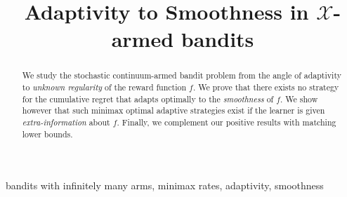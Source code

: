 \documentclass[final,12pt]{colt2018}
\title[Adaptivity in $\mathcal X$-armed bandits]{Adaptivity to Smoothness in $\mathcal X$-armed bandits}
\begin{document}
\maketitle

\begin{abstract}
We study the stochastic continuum-armed bandit problem from the angle of adaptivity to \emph{unknown regularity} of the reward function $f$. We prove that there exists no strategy for the cumulative regret that adapts optimally to the \emph{smoothness} of $f$. We show however that such minimax optimal adaptive strategies exist if the learner is given \emph{extra-information} about $f$. Finally, we complement our positive results with matching lower bounds.
\end{abstract}

\begin{keywords}
bandits with infinitely many arms, minimax rates, adaptivity, smoothness

\end{keywords}
\end{document}
